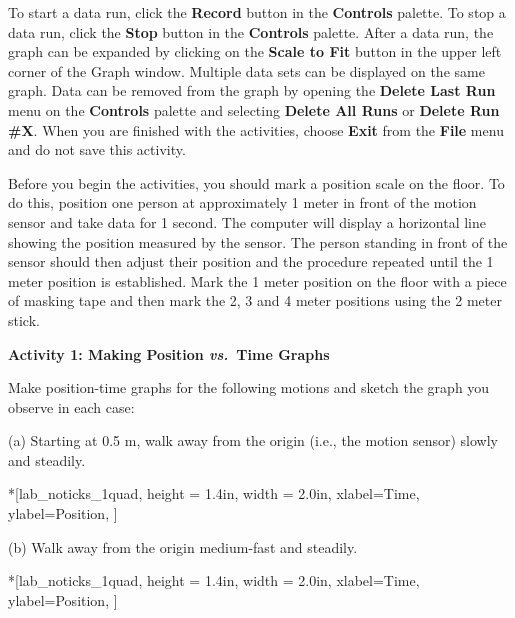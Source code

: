 To start a data run, click the \textbf{Record} button in the \textbf{Controls} palette. To stop a data run, click the \textbf{Stop} button in the \textbf{Controls} palette. After a data run, the graph can be expanded by clicking on the \textbf{Scale to Fit} button in the upper left corner of the Graph window. Multiple data sets can be displayed on the same graph. Data
can be removed from the graph by opening the \textbf{Delete Last Run} menu on the \textbf{Controls} palette and selecting \textbf{Delete All Runs} or \textbf{Delete Run \#X}. When you are finished with the activities, choose \textbf{Exit} from the \textbf{File} menu and do not save this activity.

Before you begin the activities, you should mark a position scale on the floor.
To do this, position one person at approximately 1 meter in front of the motion
sensor and take data for 1 second. The computer will display a horizontal
line showing the position measured by the sensor. The person standing in front
of the sensor should then adjust their position and the procedure repeated
until the 1 meter position is established. Mark the 1 meter position on the
floor with a piece of masking tape and then mark the 2, 3 and 4 meter positions
using the 2 meter stick.

\textbf{Activity 1: Making Position \textit{vs.}~Time Graphs }

Make position-time graphs for the following motions and sketch the graph you
observe in each case:

(a) Starting at 0.5 m, walk away from the origin (i.e., the motion sensor) slowly
and steadily.

\begin{lab_axis}*[lab_noticks_1quad,
	height = {1.4in}, width = {2.0in},
	xlabel={Time},
	ylabel={Position},
	]
\end{lab_axis}

(b) Walk away from the origin medium-fast and steadily.

\begin{lab_axis}*[lab_noticks_1quad,
	height = {1.4in}, width = {2.0in},
	xlabel={Time},
	ylabel={Position},
	]
\end{lab_axis}

